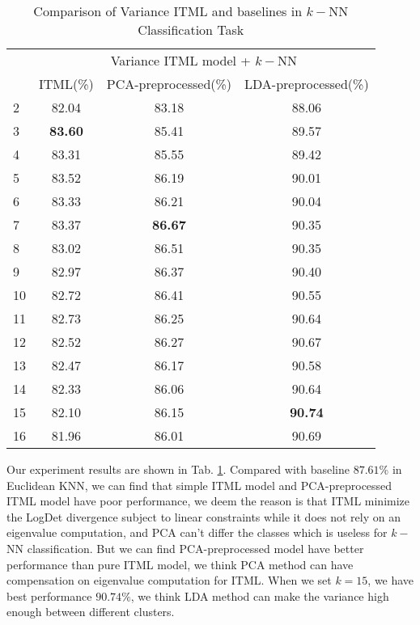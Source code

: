 \documentclass[conference]{IEEEtran}
\begin{document}
\begin{table}[htbp]
	\centering
 	\newcommand{\tabincell}[2]{\begin{tabular}{@{}#1@{}}#2\end{tabular}}
 	\renewcommand\arraystretch{1.0}
 	\caption{Comparison of Variance ITML and baselines in $k-$NN Classification Task}
 	\label{base2}%
 		\begin{tabular}{@{}p{1cm}<{\centering}|c|c|c}
 		\hline
 		\multirow{2}{*}{\diagbox[height=2\line,width=1.42cm,font=\tiny]{$k$}{Acc.}{$\mathit{M}$}} &
 		\multicolumn{3}{c}{Variance ITML model + $k-$NN}\\
 		\cline{2-4}
 		& {ITML(\%)} & {PCA-preprocessed(\%)} & {LDA-preprocessed(\%)}\\
 		\hline
 		2   & 82.04 & 83.18 & 88.06\\
 		\hline
 		3   & \textbf{83.60} & 85.41 & 89.57\\
 		\hline
 		4   & 83.31 & 85.55 & 89.42\\
 		\hline
 		5   & 83.52  & 86.19 & 90.01\\
 		\hline
 		6   & 83.33  & 86.21 & 90.04\\
 		\hline
 		7   & 83.37  & \textbf{86.67} & 90.35\\
 		\hline
 		8   & 83.02  & 86.51 & 90.35\\
 		\hline
 		9   & 82.97  & 86.37 & 90.40\\
 		\hline
 		10   & 82.72  & 86.41 & 90.55\\
 		\hline
 		11   & 82.73  & 86.25 & 90.64\\
 		\hline
 		12   & 82.52  & 86.27 & 90.67\\
 		\hline
 		13   & 82.47  & 86.17 & 90.58\\
 		\hline
 		14   & 82.33  & 86.06 & 90.64\\
 		\hline
 		15   & 82.10  & 86.15 & \textbf{90.74}\\
 		\hline
 		16   & 81.96  & 86.01 & 90.69\\
 		\hline
 	\end{tabular}
\end{table}

Our experiment results are shown in Tab. \ref{base2}. Compared with baseline $87.61\%$ in Euclidean KNN, we can find that simple ITML model and PCA-preprocessed ITML model have poor performance, we deem the reason is that ITML minimize the LogDet divergence subject to linear constraints while it does not rely on an eigenvalue computation, and PCA can't differ the classes which is useless for $k-$NN classification. But we can find PCA-preprocessed model have better performance than pure ITML model, we think PCA method can have compensation on eigenvalue computation for ITML. When we set $k=15$, we have best performance $90.74\%$, we think LDA method can make the variance high enough between different clusters. 
\end{document}
